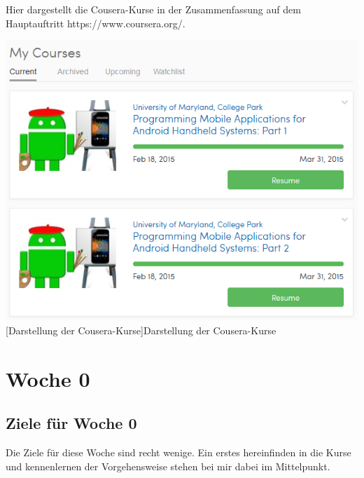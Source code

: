 \documentclass[12pt,a4paper,bibliography=totocnumbered,listof=totocnumbered]{scrartcl}
\begin{document}
Hier dargestellt die Cousera-Kurse in der Zusammenfassung auf dem Hauptauftritt \textcolor[rgb]{0,0,1}{https://www.coursera.org/}.  

\vspace{1em}
\begin{minipage}{\linewidth}
	\centering
	\includegraphics[width=0.7\linewidth]{Bilder/overview.png}
	[Darstellung der Cousera-Kurse]{Darstellung der Cousera-Kurse\footnotemark }
	\label{fig:osgi}
\end{minipage}

\pagebreak

\section{Woche 0}

\subsection{Ziele für Woche 0}
Die Ziele für diese Woche sind recht wenige. Ein erstes hereinfinden in die Kurse und kennenlernen der Vorgehensweise stehen bei mir dabei im Mittelpunkt.
\end{document}
